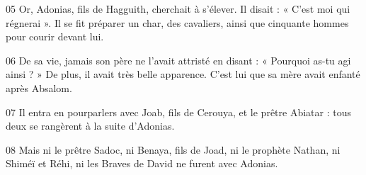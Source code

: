 
05 Or, Adonias, fils de Hagguith, cherchait à s’élever. Il disait : « C’est moi qui régnerai ». Il se fit préparer un char, des cavaliers, ainsi que cinquante hommes pour courir devant lui.

06 De sa vie, jamais son père ne l’avait attristé en disant : « Pourquoi as-tu agi ainsi ? » De plus, il avait très belle apparence. C’est lui que sa mère avait enfanté après Absalom.

07 Il entra en pourparlers avec Joab, fils de Cerouya, et le prêtre Abiatar : tous deux se rangèrent à la suite d’Adonias.

08 Mais ni le prêtre Sadoc, ni Benaya, fils de Joad, ni le prophète Nathan, ni Shiméï et Réhi, ni les Braves de David ne furent avec Adonias.

